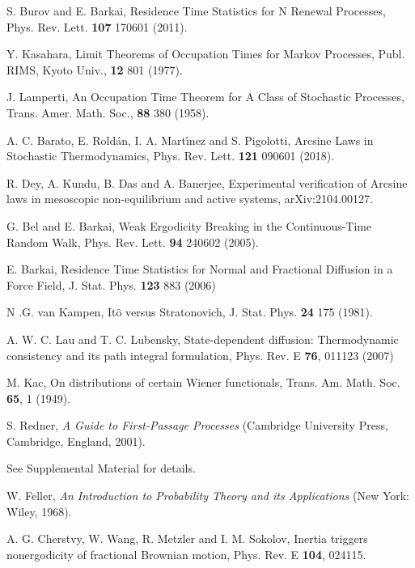 \documentclass[showpacs,amsmath,amssymb,aps,pre,twocolumn,]{revtex4-1}
\def\greenw#1{{\color{black} #1}}
\begin{document}
\begin{thebibliography}{}
S. Burov and E. Barkai, Residence Time Statistics for N Renewal Processes, {Phys. Rev. Lett.} \textbf{107} 170601 (2011).

Y. Kasahara, Limit Theorems of Occupation Times for Markov Processes, Publ. RIMS, Kyoto Univ., \textbf{12} 801 (1977).



J. Lamperti, An Occupation Time Theorem for A Class of Stochastic Processes, {Trans. Amer. Math. Soc.}, \textbf{88} 380 (1958).



A. C. Barato, E. Rold\'{a}n, I. A. Mart\'{\i}nez and S. Pigolotti, Arcsine Laws in Stochastic Thermodynamics, {Phys. Rev. Lett.} \textbf{121} 090601 (2018).

R. Dey, A. Kundu, B. Das and A. Banerjee, Experimental verification of Arcsine laws in mesoscopic non-equilibrium and active systems, arXiv:2104.00127.

G. Bel and E. Barkai, Weak Ergodicity Breaking in the Continuous-Time Random Walk, Phys. Rev. Lett. \textbf{94} 240602 (2005).

E. Barkai, Residence Time Statistics for Normal and Fractional Diffusion in a Force Field, J. Stat. Phys. \textbf{123} 883 (2006)

N .G. van Kampen, It$\hat{\text{o}}$ versus Stratonovich, J. Stat. Phys. \textbf{24} 175 (1981).

A. W. C. Lau and T. C. Lubensky, State-dependent diffusion: Thermodynamic consistency and its path integral formulation, Phys. Rev. E \textbf{76}, 011123 (2007)

M. Kac, On distributions of certain Wiener functionals, Trans. Am. Math. Soc. \textbf{65}, 1 (1949).

S. Redner, \textit{A Guide to First-Passage Processes} (Cambridge
University Press, Cambridge, England, 2001).

\greenw{See Supplemental Material for details.}

W. Feller, \textit{An Introduction to Probability Theory and its Applications} (New York: Wiley, 1968).

\greenw{A. G. Cherstvy, W. Wang, R. Metzler and I. M. Sokolov, Inertia triggers nonergodicity of fractional Brownian motion, Phys. Rev. E \textbf{104}, 024115.}





\end{thebibliography}
\end{document}
